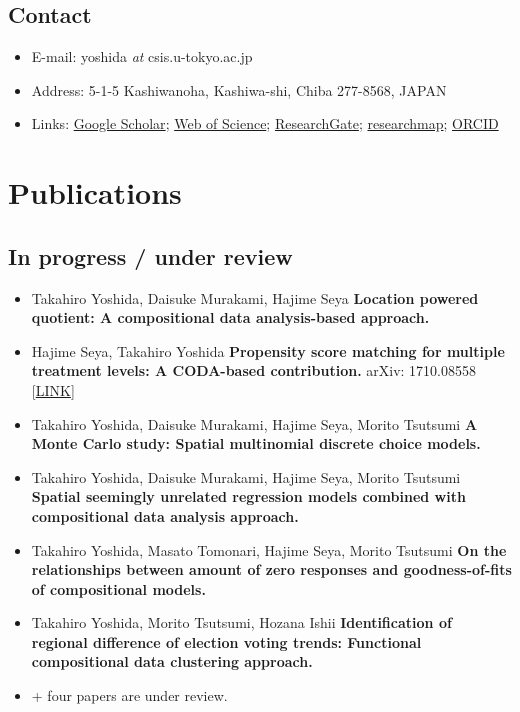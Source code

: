 \documentclass[
]{book}
\providecommand{\tightlist}{%
  \setlength{\itemsep}{0pt}\setlength{\parskip}{0pt}}
\begin{document}
\section*{Contact}\label{contact}

\begin{itemize}
\tightlist
\item
  E-mail: yoshida \emph{at} csis.u-tokyo.ac.jp
\item
  Address: 5-1-5 Kashiwanoha, Kashiwa-shi, Chiba 277-8568, JAPAN
\item
  Links: \href{https://scholar.google.co.jp/citations?user=bYbQYeUAAAAJ&hl=ja}{Google Scholar}; \href{https://www.webofscience.com/wos/author/record/847593}{Web of Science}; \href{https://www.researchgate.net/profile/Takahiro_Yoshida5}{ResearchGate}; \href{https://researchmap.jp/yoshida.takahiro}{researchmap}; \href{https://orcid.org/0000-0001-8741-5345}{ORCID}
\end{itemize}

\chapter*{Publications}\label{publications}

\section*{In progress / under review}\label{in-progress-under-review}

\begin{itemize}
\tightlist
\item
  Takahiro Yoshida, Daisuke Murakami, Hajime Seya
  \textbf{Location powered quotient: A compositional data analysis-based approach.}
\item
  Hajime Seya, Takahiro Yoshida
  \textbf{Propensity score matching for multiple treatment levels: A CODA-based contribution.}
  arXiv: 1710.08558 {[}\href{https://arxiv.org/abs/1710.08558}{LINK}{]}
\item
  Takahiro Yoshida, Daisuke Murakami, Hajime Seya, Morito Tsutsumi
  \textbf{A Monte Carlo study: Spatial multinomial discrete choice models.}
\item
  Takahiro Yoshida, Daisuke Murakami, Hajime Seya, Morito Tsutsumi
  \textbf{Spatial seemingly unrelated regression models combined with compositional data analysis approach.}
\item
  Takahiro Yoshida, Masato Tomonari, Hajime Seya, Morito Tsutsumi
  \textbf{On the relationships between amount of zero responses and goodness-of-fits of compositional models.}
\item
  Takahiro Yoshida, Morito Tsutsumi, Hozana Ishii
  \textbf{Identification of regional difference of election voting trends: Functional compositional data clustering approach.}
\item
  + four papers are under review.
\end{itemize}
\end{document}
